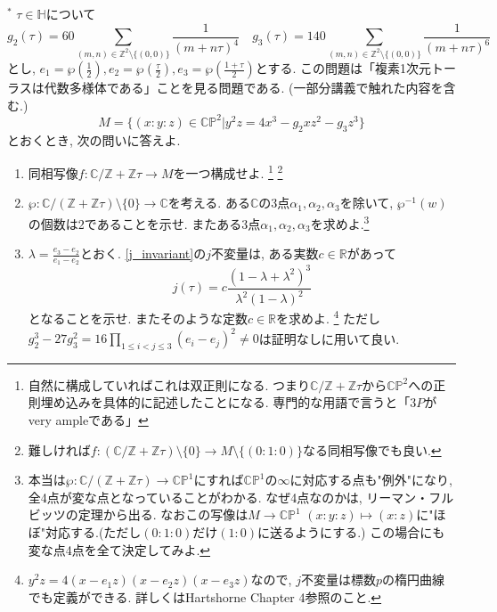 \documentclass[dvipdfmx,a4paper,11pt]{article}
\newcommand{\R}{\mathbb{R}}
\newcommand{\Z}{\mathbb{Z}}
\newcommand{\C}{\mathbb{C}}
\theoremstyle{definition}
\begin{document}
 \item $^{*}$ \label{embedding} $\tau \in \mathbb{H}$について
$$ g_2(\tau) = 60\sum_{(m,n) \in \Z^2 \setminus \{ (0,0)\} }\frac{1}{(m+ n \tau)^4}
\quad
 g_3(\tau)=140 \sum_{(m,n) \in \Z^2 \setminus \{ (0,0)\} }\frac{1}{(m+ n \tau)^6} 
 $$とし, $e_1 = \wp(\frac{1}{2}), e_2 = \wp(\frac{\tau}{2}), e_3 = \wp( \frac{1+\tau}{2})$とする.
 この問題は「複素1次元トーラスは代数多様体である」ことを見る問題である. (一部分講義で触れた内容を含む.)
 $$M = \{ (x:y:z) \in \C \mathbb{P}^2 | y^2z = 4x^3 - g_2 x z^2- g_3 z^3 \}$$とおくとき, 次の問いに答えよ. 
 \begin{enumerate}
\item  同相写像$f: \C/\Z  + \Z \tau \rightarrow  M$を一つ構成せよ.
\footnote{自然に構成していればこれは双正則になる. つまり$\C/\Z+ \Z \tau $から$\C \mathbb{P}^2$への正則埋め込みを具体的に記述したことになる. 専門的な用語で言うと「$3P$がvery ampleである」}
\footnote{難しければ$f: (\C/\Z  + \Z \tau) \setminus \{ 0\} \rightarrow  M \setminus \{ (0 : 1: 0)\}$なる同相写像でも良い.}
\item $\wp : \C/(\Z  + \Z \tau) \setminus  \{ 0\}\rightarrow \C $を考える. ある$\C$の3点$\alpha_1,\alpha_2,\alpha_3$を除いて, $\wp^{-1}(w)$の個数は2であることを示せ. またある3点$\alpha_1,\alpha_2,\alpha_3$を求めよ.\footnote{本当は$\wp : \C/(\Z  + \Z \tau) \to \C\mathbb{P}^1$にすれば$\C\mathbb{P}^1$の$\infty$に対応する点も"例外"になり, 全4点が変な点となっていることがわかる. なぜ4点なのかは, リーマン・フルビッツの定理から出る. なおこの写像は$M \to \C\mathbb{P}^1$ $(x:y:z) \mapsto (x:z)$に"ほぼ"対応する.(ただし$(0:1:0)$だけ$(1:0)$に送るようにする.) この場合にも変な点4点を全て決定してみよ.} 
\item $\lambda = \frac{e_3 - e_2}{e_1 - e_2}$とおく. \ref{j_invariant}の$j$不変量は, ある実数$c \in \R$があって
$$
j(\tau ) = c \frac{(1 - \lambda + \lambda^2)^3}{\lambda^2 (1 - \lambda)^2}
$$
となることを示せ. またそのような定数$c \in \R$を求めよ. \footnote{$y^2 z = 4(x - e_1 z)(x - e_2 z) (x - e_3 z)$なので, $j$不変量は標数$p$の楕円曲線でも定義ができる. 詳しくはHartshorne Chapter 4参照のこと. }
ただし$g_{2}^{3} - 27 g_{3}^{2} = 16\prod_{1 \le i< j \le 3}(e_i - e_j)^2 \neq 0$は証明なしに用いて良い.
 \end{enumerate}
 
\end{document}
